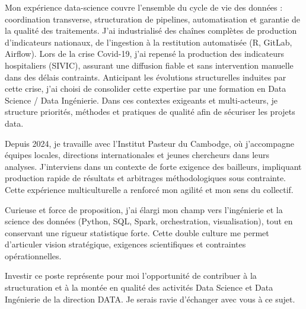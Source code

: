 \documentclass[11pt, a4paper]{awesome-cv}
\begin{document}
\begin{cvletter}
\vspace{0.5ex}

Mon expérience data-science couvre l’ensemble du cycle de vie des données : coordination transverse, structuration de pipelines, automatisation et garantie de la qualité des traitements. J’ai industrialisé des chaînes complètes de production d’indicateurs nationaux, de l’ingestion à la restitution automatisée (R, GitLab, Airflow). Lors de la crise Covid-19, j’ai repensé la production des indicateurs hospitaliers (SIVIC), assurant une diffusion fiable et sans intervention manuelle dans des délais contraints. Anticipant les évolutions structurelles induites par cette crise, j’ai choisi de consolider cette expertise par une formation en Data Science / Data Ingénierie. Dans ces contextes exigeants et multi-acteurs, je structure priorités, méthodes et pratiques de qualité afin de sécuriser les projets data.

\vspace{0.5ex}


Depuis 2024, je travaille avec l’Institut Pasteur du Cambodge, où j’accompagne équipes locales, directions internationales et jeunes chercheurs dans leurs analyses. J’interviens dans un contexte de forte exigence des bailleurs, impliquant production rapide de résultats et arbitrages méthodologiques sous contrainte. Cette expérience multiculturelle a renforcé mon agilité et mon sens du collectif.

\vspace{0.5ex}

Curieuse et force de proposition, j’ai élargi mon champ vers l’ingénierie et la science des données (Python, SQL, Spark, orchestration, visualisation), tout en conservant une rigueur statistique forte. Cette double culture me permet d’articuler vision stratégique, exigences scientifiques et contraintes opérationnelles.

\vspace{0.5ex}

Investir ce poste représente pour moi l’opportunité de contribuer à la structuration et à la montée en qualité des activités Data Science et Data Ingénierie de la direction DATA. Je serais ravie d’échanger avec vous à ce sujet.

\vspace{0.5ex}



\end{cvletter}


\makeletterclosing
\end{document}
